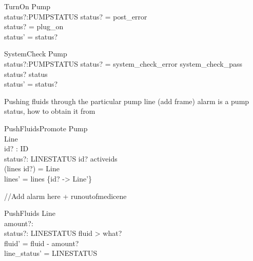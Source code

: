 \documentclass{article}
\begin{document}
	\begin{schema}{TurnOn}
		\Delta Pump \\
		status?:PUMPSTATUS
	\where 
		status? = post\_error  \\
		status? = plug\_on \\
		status' = status?
	\end{schema}
			
	\begin{schema}{SystemCheck}
		\Delta Pump\\
		status?:PUMPSTATUS
	\where 
		status? = system\_check\_error \lor system\_check\_pass \\
		status? \neq status\\
		status' = status?
	\end{schema}
	
	Pushing fluids through the particular pump line (add frame) alarm is a pump status, how to obtain it from
	
	\begin{schema}{PushFluidsPromote}
		\Delta Pump	\\
		\Delta Line \\
		id? : ID \\
		status?: LINESTATUS
	\where 
		id? \in activeids \\
		(lines id?) = \theta Line \\
		lines' = lines \oplus \{id? -> \theta Line'\} \\		
	\end{schema}
	
	//Add alarm here + runoutofmedicene
	\begin{schema}{PushFluids}
		\Delta Line \\
		amount?: \nat \\
		status?: LINESTATUS
	\where 
		fluid > what? \\
		fluid' = fluid - amount? \\
		line_status' = LINESTATUS
	\end{schema}
\end{document}
